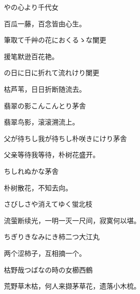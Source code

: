 \begin{haiku}
    {\FH {}やの心より}\hfill{\FH 千代女}

    {\FK 百瓜一藤，百念皆由心生。}
\end{haiku}

\begin{haiku}
    {\FH 筆取て千艸の花におくるゝな}\hfill{\FH 闌更}

    {\FK 援笔默逊百花艳。}
\end{haiku}

\begin{haiku}
    {\FH {}の日に日に折れて流れけり}\hfill{\FH 闌更}

    {\FK 枯芦苇，日日折断随流去。}
\end{haiku}

\begin{haiku}
    {\FH 翡翠の影こんこんとり}\hfill{\FH 茅舎}

    {\FK 翡翠鸟影，滚滚溯流上。}
\end{haiku}

\begin{haiku}
    {\FH 父が待ちし我が待ちし朴咲きにけり}\hfill{\FH 茅舎}

    {\FK 父亲等待我等待，朴树花盛开。}
\end{haiku}

\begin{haiku}
    {\FH {}ちしれぬかな}\hfill{\FH 茅舎}

    {\FK 朴树散花，不知去向。}
\end{haiku}

\begin{haiku}
    {\FH さびしさや消えてゆく蛍}\hfill{\FH 北枝}

    {\FK 流萤断续光，一明一灭一尺间，寂寞何以堪。}
\end{haiku}

\begin{haiku}
    {\FH ちぎりきなみにき柿二つ}\hfill{\FH 大江丸}

    {\FK 两个涩柿子，互相摘一个。}
\end{haiku}

\begin{haiku}
    {\FH 枯野哉つばなの時の女櫛}\hfill{\FH 西鶴}

    {\FK 荒野草木枯，何人来撷茅草花，遗落小木梳。}
\end{haiku}

